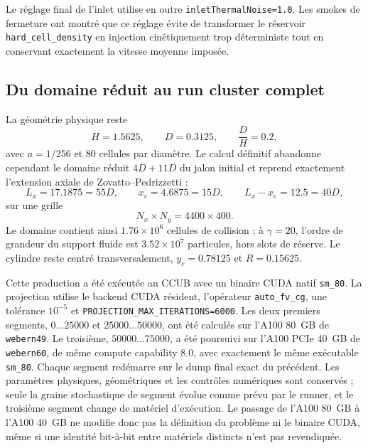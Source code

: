 \documentclass[11pt,a4paper]{article}
\begin{document}
Le réglage final de l'inlet utilise en outre \texttt{inletThermalNoise=1.0}. Les smokes de fermeture ont montré que ce réglage évite de transformer le réservoir \texttt{hard\_cell\_density} en injection cinétiquement trop déterministe tout en conservant exactement la vitesse moyenne imposée.

\subsection{Du domaine réduit au run cluster complet}

La géométrie physique reste
\begin{equation}
  H=1.5625,\qquad D=0.3125,\qquad \frac{D}{H}=0.2,
\end{equation}
avec $a=1/256$ et $80$ cellules par diamètre. Le calcul définitif abandonne cependant le domaine réduit $4D+11D$ du jalon initial et reprend exactement l'extension axiale de Zovatto--Pedrizzetti :
\begin{equation}
  L_x=17.1875=55D,\qquad
  x_c=4.6875=15D,\qquad
  L_x-x_c=12.5=40D,
\end{equation}
sur une grille
\begin{equation}
  N_x\times N_y=4400\times400.
\end{equation}
Le domaine contient ainsi $1.76\times10^6$ cellules de collision ; à $\gamma=20$, l'ordre de grandeur du support fluide est $3.52\times10^7$ particules, hors slots de réserve. Le cylindre reste centré transversalement, $y_c=0.78125$ et $R=0.15625$.

Cette production a été exécutée au CCUB avec un binaire CUDA natif \texttt{sm\_80}. La projection utilise le backend CUDA résident, l'opérateur \texttt{auto\_fv\_cg}, une tolérance $10^{-5}$ et \texttt{PROJECTION\_MAX\_ITERATIONS=6000}. Les deux premiers segments, $0\ldots25000$ et $25000\ldots50000$, ont été calculés sur l'A100 80~GB de \texttt{webern49}. Le troisième, $50000\ldots75000$, a été poursuivi sur l'A100 PCIe 40~GB de \texttt{webern60}, de même compute capability 8.0, avec exactement le même exécutable \texttt{sm\_80}. Chaque segment redémarre sur le dump final exact du précédent. Les paramètres physiques, géométriques et les contrôles numériques sont conservés ; seule la graine stochastique de segment évolue comme prévu par le runner, et le troisième segment change de matériel d'exécution. Le passage de l'A100 80~GB à l'A100 40~GB ne modifie donc pas la définition du problème ni le binaire CUDA, même si une identité bit-à-bit entre matériels distincts n'est pas revendiquée.
\end{document}
